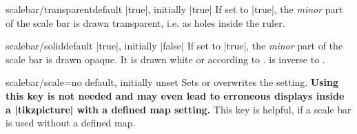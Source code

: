 \begin{docMrcKey}{scalebar/transparent}{}{default |true|, initially |true|}
  If set to |true|, the \emph{minor} part of the scale bar is drawn transparent,
  i.e. as holes inside the ruler.
\end{docMrcKey}


\begin{docMrcKey}{scalebar/solid}{}{default |true|, initially |false|}
  If set to |true|, the \emph{minor} part of the scale bar is drawn opaque.
  It is drawn white or according to .
   is inverse to .
\end{docMrcKey}


\begin{docMrcKey}{scalebar/scale}{=}{no default, initially unset}
  Sets or overwrites the  setting.
  \textbf{Using this key is not needed and may even lead to erroneous displays
    inside a |tikzpicture| with a defined map setting.}
  This key is helpful, if a scale bar is used without a defined map.
\end{docMrcKey}

